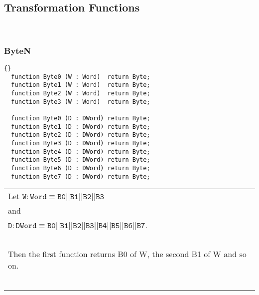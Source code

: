 
\subsection{Transformation Functions}\ \\

\subsubsection{ByteN}
\begin{lstlisting}{}
  function Byte0 (W : Word)  return Byte;
  function Byte1 (W : Word)  return Byte;
  function Byte2 (W : Word)  return Byte;
  function Byte3 (W : Word)  return Byte; 

  function Byte0 (D : DWord) return Byte;
  function Byte1 (D : DWord) return Byte;
  function Byte2 (D : DWord) return Byte;
  function Byte3 (D : DWord) return Byte;
  function Byte4 (D : DWord) return Byte;
  function Byte5 (D : DWord) return Byte;
  function Byte6 (D : DWord) return Byte;
  function Byte7 (D : DWord) return Byte;
\end{lstlisting}
\begin{tabular}{p{\textwidth}}
Let
$\mathtt{W : Word  \equiv B0||B1||B2||B3}$\\
and\\
$\mathtt{D : DWord \equiv B0||B1||B2||B3||B4||B5||B6||B7}$.\\ 
\ \\
Then the first function returns B0 of W,  the second B1 of W and so on.\\ \ \\
\hline\\
\end{tabular}


